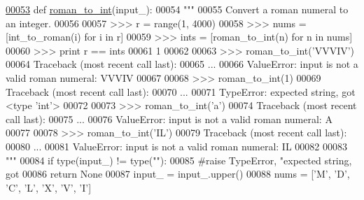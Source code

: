 \begin{DoxyCode}
\hypertarget{namespacepyneb_1_1utils_1_1misc_l00053}{}\hyperlink{namespacepyneb_1_1utils_1_1misc_a97329c3ce57bd870421672b90e3e6541}{00053} \textcolor{keyword}{def }\hyperlink{namespacepyneb_1_1utils_1_1misc_a97329c3ce57bd870421672b90e3e6541}{roman\_to\_int}(input\_):
00054     \textcolor{stringliteral}{"""}
00055 \textcolor{stringliteral}{    Convert a roman numeral to an integer.}
00056 \textcolor{stringliteral}{    }
00057 \textcolor{stringliteral}{    >>> r = range(1, 4000)}
00058 \textcolor{stringliteral}{    >>> nums = [int\_to\_roman(i) for i in r]}
00059 \textcolor{stringliteral}{    >>> ints = [roman\_to\_int(n) for n in nums]}
00060 \textcolor{stringliteral}{    >>> print r == ints}
00061 \textcolor{stringliteral}{    1}
00062 \textcolor{stringliteral}{    }
00063 \textcolor{stringliteral}{    >>> roman\_to\_int('VVVIV')}
00064 \textcolor{stringliteral}{    Traceback (most recent call last):}
00065 \textcolor{stringliteral}{     ...}
00066 \textcolor{stringliteral}{    ValueError: input is not a valid roman numeral: VVVIV}
00067 \textcolor{stringliteral}{}
00068 \textcolor{stringliteral}{    >>> roman\_to\_int(1)}
00069 \textcolor{stringliteral}{    Traceback (most recent call last):}
00070 \textcolor{stringliteral}{     ...}
00071 \textcolor{stringliteral}{    TypeError: expected string, got <type 'int'>}
00072 \textcolor{stringliteral}{}
00073 \textcolor{stringliteral}{    >>> roman\_to\_int('a')}
00074 \textcolor{stringliteral}{    Traceback (most recent call last):}
00075 \textcolor{stringliteral}{     ...}
00076 \textcolor{stringliteral}{    ValueError: input is not a valid roman numeral: A}
00077 \textcolor{stringliteral}{}
00078 \textcolor{stringliteral}{    >>> roman\_to\_int('IL')}
00079 \textcolor{stringliteral}{    Traceback (most recent call last):}
00080 \textcolor{stringliteral}{     ...}
00081 \textcolor{stringliteral}{    ValueError: input is not a valid roman numeral: IL}
00082 \textcolor{stringliteral}{}
00083 \textcolor{stringliteral}{    """}   
00084     \textcolor{keywordflow}{if} type(input\_) != type(\textcolor{stringliteral}{""}):
00085         \textcolor{comment}{#raise TypeError, "expected string, got %
00086         \textcolor{keywordflow}{return} \textcolor{keywordtype}{None}
00087     input\_ = input\_.upper()
00088     nums = [\textcolor{stringliteral}{'M'}, \textcolor{stringliteral}{'D'}, \textcolor{stringliteral}{'C'}, \textcolor{stringliteral}{'L'}, \textcolor{stringliteral}{'X'}, \textcolor{stringliteral}{'V'}, \textcolor{stringliteral}{'I'}]
}
\end{DoxyCode}
